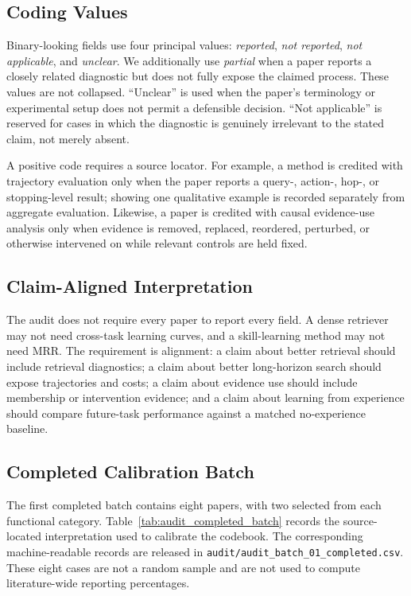 \subsection{Coding Values}
Binary-looking fields use four principal values: \emph{reported}, \emph{not reported}, \emph{not applicable}, and \emph{unclear}. We additionally use \emph{partial} when a paper reports a closely related diagnostic but does not fully expose the claimed process. These values are not collapsed. ``Unclear'' is used when the paper's terminology or experimental setup does not permit a defensible decision. ``Not applicable'' is reserved for cases in which the diagnostic is genuinely irrelevant to the stated claim, not merely absent.

A positive code requires a source locator. For example, a method is credited with trajectory evaluation only when the paper reports a query-, action-, hop-, or stopping-level result; showing one qualitative example is recorded separately from aggregate evaluation. Likewise, a paper is credited with causal evidence-use analysis only when evidence is removed, replaced, reordered, perturbed, or otherwise intervened on while relevant controls are held fixed.

\subsection{Claim-Aligned Interpretation}
The audit does not require every paper to report every field. A dense retriever may not need cross-task learning curves, and a skill-learning method may not need MRR. The requirement is alignment: a claim about better retrieval should include retrieval diagnostics; a claim about better long-horizon search should expose trajectories and costs; a claim about evidence use should include membership or intervention evidence; and a claim about learning from experience should compare future-task performance against a matched no-experience baseline.

\subsection{Completed Calibration Batch}
The first completed batch contains eight papers, with two selected from each functional category. Table~\ref{tab:audit_completed_batch} records the source-located interpretation used to calibrate the codebook. The corresponding machine-readable records are released in \texttt{audit/audit\_batch\_01\_completed.csv}. These eight cases are not a random sample and are not used to compute literature-wide reporting percentages.

